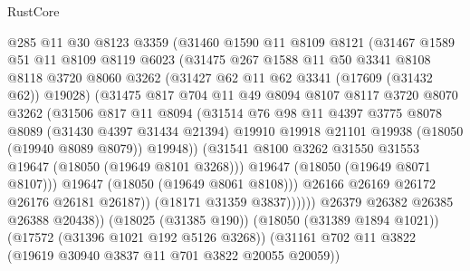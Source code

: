 \begin{lexlean}{RustCore}
\begin{coremodule}
                  @285
                  @11
                  @30
                  @8123
                  @3359
                  (@31460
                    @1590
                    @11
                    @8109
                    @8121
                    (@31467
                      @1589
                      @51
                      @11
                      @8109
                      @8119
                      @6023
                      (@31475
                        @267
                        @1588
                        @11
                        @50
                        @3341
                        @8108
                        @8118
                        @3720
                        @8060
                        @3262
                        (@31427 @62 @11 @62 @3341 (@17609 (@31432 @62)) @19028)
                        (@31475
                          @817
                          @704
                          @11
                          @49
                          @8094
                          @8107
                          @8117
                          @3720
                          @8070
                          @3262
                          (@31506
                            @817
                            @11
                            @8094
                            (@31514
                              @76
                              @98
                              @11
                              @4397
                              @3775
                              @8078
                              @8089
                              (@31430 @4397 @31434 @21394)
                              @19910
                              @19918
                              @21101
                              @19938
                              (@18050 (@19940 @8089 @8079))
                              @19948))
                          (@31541 @8100 @3262 @31550 @31553 @19647 (@18050 (@19649 @8101 @3268)))
                          @19647
                          (@18050 (@19649 @8071 @8107)))
                        @19647
                        (@18050 (@19649 @8061 @8108)))
                      @26166
                      @26169
                      @26172
                      @26176
                      @26181
                      @26187))
                  (@18171 @31359 @3837))))))
        @26379
        @26382
        @26385
        @26388
        @20438))
    (@18025 (@31385 @190))
    (@18050 (@31389 @1894 @1021))
    (@17572 (@31396 @1021 @192 @5126 @3268))
    (@31161 @702 @11 @3822 (@19619 @30940 @3837 @11 @701 @3822 @20055 @20059))

\end{coremodule}
\end{lexlean}
